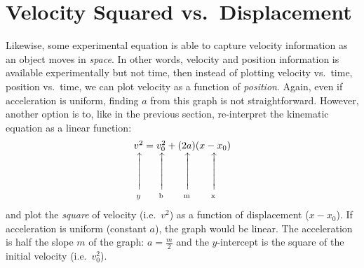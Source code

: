 \documentclass[11pt]{article}
\makeatletter
\newcommand\vertarrowbox[2]{%
    \begin{array}[t]{@{}c@{}} #1 \\
    \rotatebox{90}{$\xrightarrow{\hphantom{abcdefgh}}$} \\[-1ex]
    \mathclap{\scriptstyle\text{#2}}%
    \end{array}}
\makeatother
\begin{document}
\section{Velocity Squared vs.\ Displacement}
Likewise, some experimental equation is able to capture velocity information
as an object moves in \emph{space}. In other words, velocity and position
information is available experimentally but not time, then instead of plotting
velocity vs.\ time, position vs.\ time, we can plot velocity as a function of
\emph{position}. Again, even if acceleration is uniform, finding $a$ from this
graph is not straightforward. However, another option is to, like in the
previous section, re-interpret the kinematic equation as a linear function:
\begin{equation}
  \vertarrowbox{v^2}{$y$}=
  \vertarrowbox{v_0^2}{b}+\vertarrowbox{(2a)}{m}
  \vertarrowbox{(x-x_0)}{x}
\end{equation}
and plot the \emph{square} of velocity (i.e.\ $v^2$) as a function of
displacement ($x-x_0$). If acceleration is uniform (constant $a$), the graph
would be linear. The acceleration is half the slope $m$ of the graph:
$\displaystyle a=\frac{m}{2}$ and the $y$-intercept is the square of the
initial velocity (i.e.\ $v_0^2$).
\end{document}

